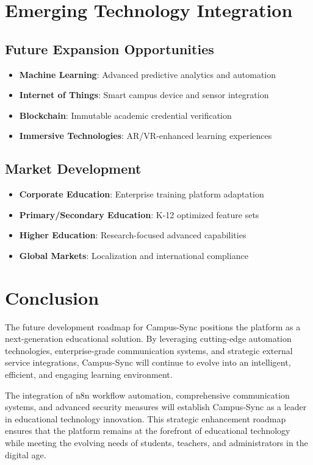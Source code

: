 \section{Emerging Technology Integration}

\subsection{Future Expansion Opportunities}

\begin{itemize}
    \item \textbf{Machine Learning}: Advanced predictive analytics and automation
    \item \textbf{Internet of Things}: Smart campus device and sensor integration
    \item \textbf{Blockchain}: Immutable academic credential verification
    \item \textbf{Immersive Technologies}: AR/VR-enhanced learning experiences
\end{itemize}

\subsection{Market Development}

\begin{itemize}
    \item \textbf{Corporate Education}: Enterprise training platform adaptation
    \item \textbf{Primary/Secondary Education}: K-12 optimized feature sets
    \item \textbf{Higher Education}: Research-focused advanced capabilities
    \item \textbf{Global Markets}: Localization and international compliance
\end{itemize}

\section{Conclusion}

The future development roadmap for Campus-Sync positions the platform as a next-generation educational solution. By leveraging cutting-edge automation technologies, enterprise-grade communication systems, and strategic external service integrations, Campus-Sync will continue to evolve into an intelligent, efficient, and engaging learning environment.

The integration of n8n workflow automation, comprehensive communication systems, and advanced security measures will establish Campus-Sync as a leader in educational technology innovation. This strategic enhancement roadmap ensures that the platform remains at the forefront of educational technology while meeting the evolving needs of students, teachers, and administrators in the digital age.